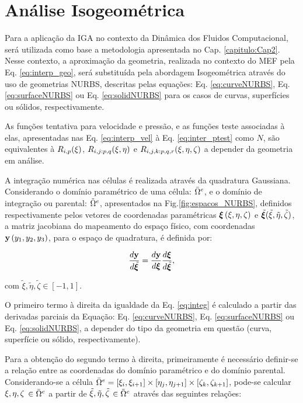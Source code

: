 \documentclass[tese_patricia]{subfiles}
\begin{document}
\section{Análise Isogeométrica}\label{capitulo:Cap3:IGA}


Para a aplicação da IGA no contexto da Dinâmica dos Fluidos Computacional, será utilizada como base a metodologia apresentada no Cap. \ref{capitulo:Cap2}. Nesse contexto, a aproximação da geometria, realizada no contexto do MEF pela Eq. \ref{eq:interp_geo}, será substituída pela abordagem Isogeométrica através do uso de geometrias NURBS, descritas pelas equações: Eq. \ref{eq:curveNURBS}, Eq. \ref{eq:surfaceNURBS} ou Eq. \ref{eq:solidNURBS} para os casos de curvas, superfícies ou sólidos, respectivamente.

As funções tentativa para velocidade e pressão, e as funções teste associadas à elas, apresentadas nas Eq. \eqref{eq:interp_vel} à Eq. \eqref{eq:inter_ptest} como $N$, são equivalentes à $R_{i,p}(\xi)$, $R_{i,j:p,q}(\xi,\eta)$ e $R_{i,j,k:p,q,r}(\xi,\eta,\zeta)$ a depender da geometria em análise.

A integração numérica nas células é realizada através da quadratura Gaussiana. Considerando o domínio paramétrico de uma célula: $\bar{\Omega}^{e}$, e o domínio de integração ou parental: $\tilde{\Omega}^{e}$, apresentados na Fig.\ref{fig:espacos_NURBS}, definidos respectivamente pelos vetores de coordenadas paramétricas $\bm{\xi}\left(\xi,\eta,\zeta\right)$ e $\tilde{\bm{\xi}}(\tilde{\xi},\tilde{\eta},\tilde{\zeta})$, a matriz jacobiana do mapeamento do espaço físico, com coordenadas $\mathbf{y} \left(y_1,y_2,y_3\right)$,  para o espaço de quadratura, é definida por:

\begin{align}
\frac{d\mathbf{y}}{d\tilde{\bm{\xi}}} = \frac{d\mathbf{y}}{d\bm{\xi}} \frac{d\bm{\xi}}{d\tilde{\bm{\xi}}}, \label{eq:integ}
\end{align} 

\noindent com $\tilde{\xi}, \tilde{\eta}, \tilde{\zeta} \in [-1, 1]$.

O primeiro termo à direita da igualdade da Eq. \eqref{eq:integ} é calculado a partir das derivadas parciais da Equação: Eq. \eqref{eq:curveNURBS}, Eq. \eqref{eq:surfaceNURBS} ou Eq. \eqref{eq:solidNURBS}, a depender do tipo da geometria em questão (curva, superfície ou sólido, respectivamente).

Para a obtenção do segundo termo à direita, primeiramente é necessário definir-se a relação entre as coordenadas  do domínio paramétrico e do domínio parental. Considerando-se a célula $\bar{\Omega}^{e} = [\xi_{i},\xi_{i+1}] \times [\eta_{j},\eta_{j+1}] \times [\zeta_{k},\zeta_{k+1}]$, pode-se calcular $\xi,\eta, \zeta$ $\in \bar{\Omega}^{e}$ a partir de $\tilde{\xi},\tilde{\eta}, \tilde{\zeta}$ $\in \tilde{\Omega}^{e}$ através das seguintes relações: 
\end{document}
